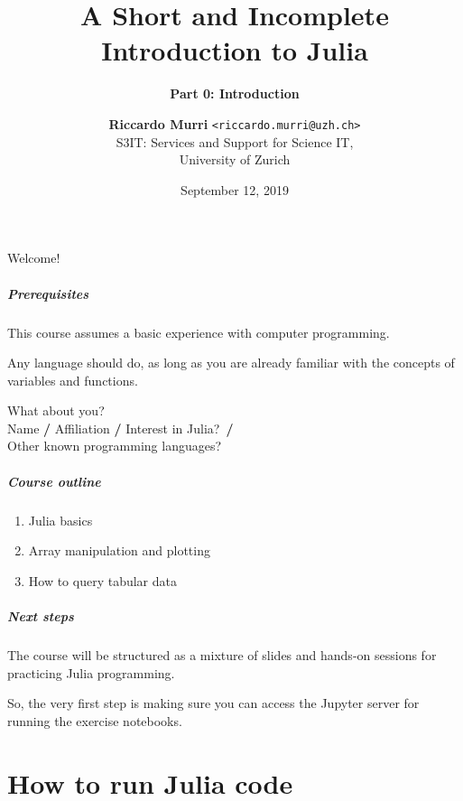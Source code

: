 \documentclass[english,serif,mathserif,xcolor=pdftex,dvipsnames,table]{beamer}
\title[Getting started]{%
  A Short and Incomplete Introduction to Julia
}
\subtitle{\bfseries Part 0: Introduction}
\author[R.~Murri]{%
  \textbf{Riccardo Murri} \texttt{<riccardo.murri@uzh.ch>}
  \\
  S3IT: Services and Support for Science IT,
  \\
  University of Zurich
}
\date{September 12, 2019}
\begin{document}
\maketitle

\begin{frame}
  \begin{center}
    {\Huge Welcome!}
  \end{center}
\end{frame}


\begin{frame}
  \frametitle{Prerequisites}
  This course assumes a basic experience with computer programming.

  \+
  Any language should do, as long as you are already familiar with
  the concepts of variables and functions.
\end{frame}


\begin{frame}
  \begin{center}
    {\Huge What about you?}
    \\ \+ \+
    \small
    Name \textbf{/}
    Affiliation \textbf{/}
    Interest in Julia?~\textbf{/}
    \\
    Other known programming languages?
  \end{center}
\end{frame}


\begin{frame}
  \frametitle{Course outline}
  \begin{enumerate}
  \item Julia basics
  \item Array manipulation and plotting
  \item How to query tabular data
  \end{enumerate}
\end{frame}


\begin{frame}
  \frametitle{Next steps}

  The course will be structured as a mixture of slides and hands-on
  sessions for practicing Julia programming.

  \+
  So, the very first step is making sure you can access the Jupyter
  server for running the exercise notebooks.
\end{frame}


\part{How to run Julia code}
\end{document}
